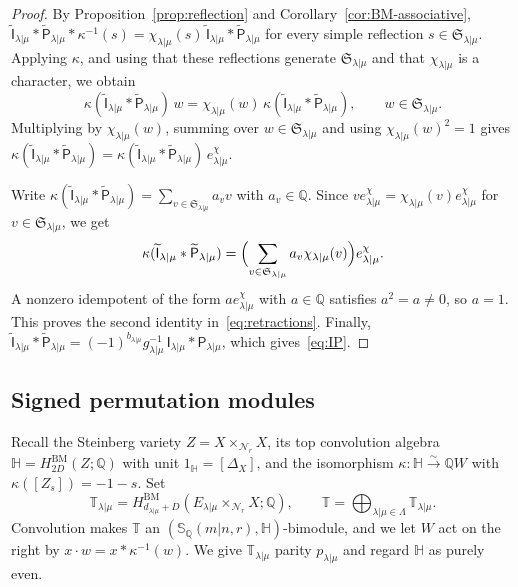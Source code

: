\documentclass[11pt,a4paper]{amsart}
\theoremstyle{definition}
\theoremstyle{remark}
\newcommand{\Q}{\mathbb Q}
\newcommand{\N}{\mathcal N}
\newcommand{\bS}{\mathbb S}
\newcommand{\bH}{\mathbb H}
\newcommand{\bT}{\mathbb T}
\newcommand{\BM}{\mathrm{BM}}
\newcommand{\lm}{\lambda|\mu}
\numberwithin{equation}{section}
\begin{document}
\begin{proof}
By Proposition~\ref{prop:reflection} and
Corollary~\ref{cor:BM-associative},
$\widetilde{\mathsf I}_{\lm}*\widetilde{\mathsf P}_{\lm}*\kappa^{-1}(s)
=\chi_{\lm}(s)\,\widetilde{\mathsf I}_{\lm}*\widetilde{\mathsf P}_{\lm}$
for every simple reflection $s\in\mathfrak S_{\lm}$. Applying $\kappa$, and
using that these reflections generate $\mathfrak S_{\lm}$ and that
$\chi_{\lm}$ is a character, we obtain
$$
\kappa(\widetilde{\mathsf I}_{\lm}*\widetilde{\mathsf P}_{\lm})\,w
=\chi_{\lm}(w)\,\kappa(\widetilde{\mathsf I}_{\lm}*\widetilde{\mathsf P}_{\lm}),
\qquad w\in\mathfrak S_{\lm}.
$$
Multiplying by $\chi_{\lm}(w)$, summing over $w\in\mathfrak S_{\lm}$ and
using $\chi_{\lm}(w)^2=1$ gives
$\kappa(\widetilde{\mathsf I}_{\lm}*\widetilde{\mathsf P}_{\lm})
=\kappa(\widetilde{\mathsf I}_{\lm}*\widetilde{\mathsf P}_{\lm})\,e^\chi_{\lm}$.

Write
$\kappa(\widetilde{\mathsf I}_{\lm}*\widetilde{\mathsf P}_{\lm})
=\sum_{v\in\mathfrak S_{\lm}}a_vv$ with $a_v\in\Q$. Since
$ve^\chi_{\lm}=\chi_{\lm}(v)e^\chi_{\lm}$ for $v\in\mathfrak S_{\lm}$, we get
$$
\kappa(\widetilde{\mathsf I}_{\lm}*\widetilde{\mathsf P}_{\lm})
=\Bigl(\sum_{v\in\mathfrak S_{\lm}}a_v\chi_{\lm}(v)\Bigr)e^\chi_{\lm}.
$$
A nonzero idempotent of the form $ae^\chi_{\lm}$ with $a\in\Q$ satisfies
$a^2=a\ne0$, so $a=1$. This proves the second identity
in~\eqref{eq:retractions}. Finally,
$\widetilde{\mathsf I}_{\lm}*\widetilde{\mathsf P}_{\lm}
=(-1)^{b_{\lm}}g_{\lm}^{-1}\,\mathsf I_{\lm}*\mathsf P_{\lm}$, which
gives~\eqref{eq:IP}.
\end{proof}
\subsection{Signed permutation modules}
\label{sec:tensor-module}

Recall the Steinberg variety $Z=X\times_{\N_r}X$, its top convolution
algebra $\bH=H^{\BM}_{2D}(Z;\Q)$ with unit $1_{\bH}=[\Delta_X]$, and the
isomorphism $\kappa:\bH\xrightarrow{\sim}\Q W$ with $\kappa([Z_s])=-1-s$. Set
$$
\bT_{\lm}=H^{\BM}_{d_{\lm}+D}(E_{\lm}\times_{\N_r}X;\Q),\qquad
\bT=\bigoplus_{\lm\in\Lambda}\bT_{\lm}.
$$
Convolution makes $\bT$ an $(\bS_\Q(m|n,r),\bH)$-bimodule, and we let $W$ act on the
right by $x\cdot w=x*\kappa^{-1}(w)$. We give $\bT_{\lm}$ parity
$p_{\lm}$ and regard $\bH$ as purely even.
\end{document}

